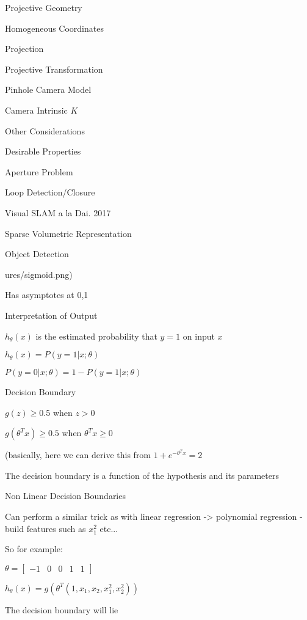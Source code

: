 \begin{section}
\begin{subsubsection}
\begin{subsubsection}
\begin{subsubsection}
\begin{section}{Projective Geometry}
\begin{subsection}{Homogeneous Coordinates}
\begin{subsubsection}
{\begin{subsubsection}{Projection}
\begin{subsubsection}{Projective Transformation}
\begin{subsection}
\begin{subsubsection}
\begin{subsubsection}
\begin{subsubsection}
{\begin{subsubsection}
\begin{subsection}
\begin{subsection} {Pinhole Camera Model}
\begin{subsection} {Camera Intrinsic $K$}
\begin{subsection}
\begin{subsection}
\begin{subsubsection}{Other Considerations}
{\begin{subsection}
\begin{subsubsection}{Desirable Properties}
\begin{section}
\begin{subsection}
\begin{subsection}
\begin{subsection}
\begin{section}
\begin{subsection}
\begin{subsubsection}
\begin{subsubsection}
\begin{subsection}
\begin{section}
\begin{subsection}
\begin{subsubsection}{Aperture Problem}
\begin{subsubsection}
{\begin{section}
\begin{subsubsection}
\begin{subsubsection}
\begin{subsubsection}
\begin{subsection}
\begin{subsection}
\begin{subsection}
\begin{subsection}
\begin{subsection}
\begin{subsection}
\begin{subsection}
\begin{subsubsection}
{\begin{subsubsection}
{\begin{subsubsection}
\begin{section}
\begin{section}
\begin{section}
\begin{subsubsection}
\begin{subsubsection}{Loop Detection/Closure}
\begin{subsubsection}{Visual SLAM a la Dai. 2017}
\begin{subsubsection}{Sparse Volumetric Representation}
\begin{subsection}
\begin{section}{Object Detection}
\begin{subsubsection}
{\begin{subsection}
\begin{subsection}
\begin{section}
\begin{section}
\begin{subsection}
\begin{subsubsection}
\begin{subsubsection}
\begin{subsection}
\begin{subsection}
\begin{subsubsection}
\begin{subsubsection}
\begin{subsubsection}
{\begin{subsection}
\begin{subsection}
\begin{subsection}
\begin{subsection}
\begin{section}
\begin{subsection}
\begin{subsubsection}
ures/sigmoid.png)

Has  asymptotes at {0,1}

\begin{subsubsection} Interpretation of Output

$h_\theta(x)$ is the estimated probability that  $y=1$ on input $x$ 

$h_\theta(x) = P(y=1|x;\theta)$ 

$P(y=0|x;\theta) = 1-P(y=1|x;\theta)$

\begin{subsubsection} Decision Boundary

$g(z) \ge 0$.5 when $z>0$ 

$g(\theta^T x ) \ge 0.5$ when $\theta^Tx \ge 0$

(basically, here we  can derive this from $1+e^{-\theta^T x}  = 2$

The decision boundary is a function of the hypothesis and its parameters

\begin{subsubsection} Non Linear Decision Boundaries

Can perform a similar trick as with linear regression -> polynomial regression - build features such as $x_1^2$ etc...

So for example: 

$\theta = \left[ \begin{matrix} -1 & 0 & 0  & 1 & 1 \end{matrix} \right]$ 

$h_\theta(x) = g(\theta^T(1,x_1,x_2,x_1^2,x_2^2 )) $

The decision boundary will lie 
\end{subsubsection}
\end{subsubsection}
\end{subsubsection}
\end{subsubsection}
\end{subsection}
\end{section}
\end{subsection}
\end{subsection}
\end{subsection}
\end{subsection}}
\end{subsubsection}
\end{subsubsection}
\end{subsubsection}
\end{subsection}
\end{subsection}
\end{subsubsection}
\end{subsubsection}
\end{subsection}
\end{section}
\end{section}
\end{subsection}
\end{subsection}}
\end{subsubsection}
\end{section}
\end{subsection}
\end{subsubsection}
\end{subsubsection}
\end{subsubsection}
\end{subsubsection}
\end{section}
\end{section}
\end{section}
\end{subsubsection}}
\end{subsubsection}}
\end{subsubsection}
\end{subsection}
\end{subsection}
\end{subsection}
\end{subsection}
\end{subsection}
\end{subsection}
\end{subsection}
\end{subsubsection}
\end{subsubsection}
\end{subsubsection}
\end{section}}
\end{subsubsection}
\end{subsubsection}
\end{subsection}
\end{section}
\end{subsection}
\end{subsubsection}
\end{subsubsection}
\end{subsection}
\end{section}
\end{subsection}
\end{subsection}
\end{subsection}
\end{section}
\end{subsubsection}
\end{subsection}}
\end{subsubsection}
\end{subsection}
\end{subsection}
\end{subsection}
\end{subsection}
\end{subsection}
\end{subsubsection}}
\end{subsubsection}
\end{subsubsection}
\end{subsubsection}
\end{subsection}
\end{subsubsection}
\end{subsubsection}}
\end{subsubsection}
\end{subsection}
\end{section}
\end{subsubsection}
\end{subsubsection}
\end{subsubsection}
\end{section}
